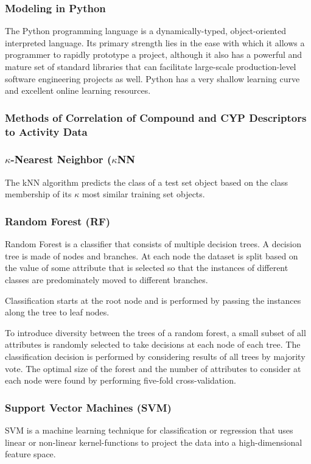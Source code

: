 \subsubsection{Modeling in Python}
The Python programming language is a dynamically-typed, object-oriented interpreted language. Its primary strength lies in the ease with which it allows a programmer to rapidly prototype a project, although it also has a powerful and mature set of standard libraries that can facilitate large-scale production-level software engineering projects as well. Python has a very shallow learning curve and excellent online learning resources.


\subsubsection{Methods of Correlation of Compound and CYP Descriptors to Activity Data}

\subsubsection{$\kappa$-Nearest Neighbor ($\kappa$NN}
The kNN algorithm predicts the class of a test set object based on the class membership of its $\kappa$ most similar training set objects. \cite{Lapins2013}

\subsubsection{Random Forest (RF)}
Random Forest is a classifier that consists of multiple decision trees. A decision tree is made of nodes and branches. At each node the dataset is split based on the value of some attribute that is selected so that the instances of different classes are predominately moved to different branches. 

Classification starts at the root node and is performed by passing the instances along the tree to leaf nodes. \cite{Lapins2013}

To introduce diversity between the trees of a random forest, a small subset of all attributes is randomly selected to take decisions at each node of each tree. The classification decision is performed by considering results of all trees by majority vote. The optimal size of the forest and the number of attributes to consider at each node were found by performing five-fold cross-validation. \cite{Lapins2013}

\subsubsection{Support Vector Machines (SVM)}
SVM is a machine learning technique for classification or regression that uses linear or non-linear kernel-functions to project the data into a high-dimensional feature space. \cite{Lapins2013}

